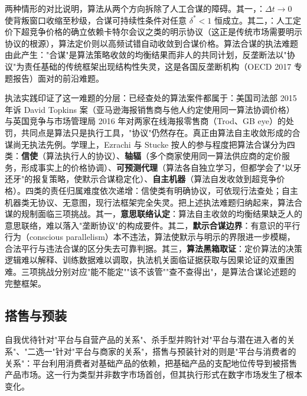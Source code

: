 两种情形的对比说明，算法从两个方向拆除了人工合谋的障碍。其一，：$\Delta t \to 0$ 使背叛窗口收缩至秒级，合谋可持续性条件对任意 $\delta^* < 1$ 恒成立。其二，：人工定价下超竞争价格的确立依赖卡特尔会议之类的明示协议（这正是传统市场需要明示协议的根源），算法定价则以高频试错自动收敛到合谋价格。算法合谋的执法难题由此产生："合谋"是算法策略收敛的均衡结果而非人的共同计划，反垄断法以"协议"为责任基础的传统框架出现结构性失灵，这是各国反垄断机构（OECD 2017 专题报告）面对的前沿难题。

执法实践印证了这一难题的分层：已经查处的算法案件都属于：美国司法部 2015 年诉 David Topkins 案（亚马逊海报销售商与他人约定使用同一算法协调价格）与英国竞争与市场管理局 2016 年对两家在线海报零售商（Trod、GB eye）的处罚，共同点是算法只是执行工具，"协议"仍然存在。真正由算法自主收敛形成的合谋尚无执法先例。学理上，Ezrachi 与 Stucke 按人的参与程度把算法合谋分为四类：\textbf{信使}（算法执行人的协议）、\textbf{轴辐}（多个商家使用同一算法供应商的定价服务，形成事实上的价格协调）、\textbf{可预测代理}（算法各自独立学习，但都学会了"以牙还牙"的报复策略，使默示合谋稳定化）、\textbf{自主机器}（算法自发收敛到超竞争价格）。四类的责任归属难度依次递增：信使类有明确协议，可依现行法查处；自主机器类无协议、无意图，现行法框架完全失灵。把上述执法难题归纳起来，算法合谋的规制面临三项挑战。其一，\textbf{意思联络认定}：算法自主收敛的均衡结果缺乏人的意思联络，难以落入"垄断协议"的构成要件。其二，\textbf{默示合谋边界}：有意识的平行行为（conscious parallelism）本不违法，算法使默示与明示的界限进一步模糊，合法平行与违法合谋的区分失去可靠判据。其三，\textbf{算法黑箱取证}：定价算法的决策逻辑难以解释、训练数据难以调取，执法机关面临证据获取与因果论证的双重困难。三项挑战分别对应"能不能定""该不该管""查不查得出"，是算法合谋论述题的完整框架。

\subsection{搭售与预装}

自我优待针对"平台与自营产品的关系"、杀手型并购针对"平台与潜在进入者的关系"、"二选一"针对"平台与商家的关系"，搭售与预装针对的则是"平台与消费者的关系"：平台利用消费者对基础产品的依赖，把基础产品的支配地位传导到被搭售产品市场。这一行为类型并非数字市场首创，但其执行形式在数字市场发生了根本变化。

